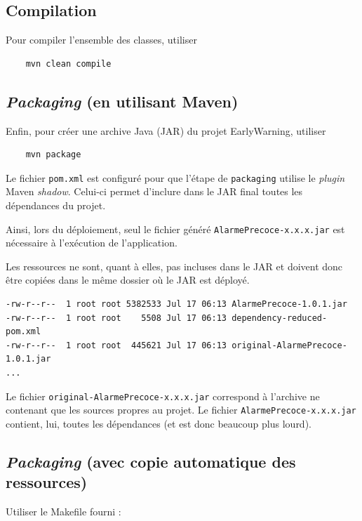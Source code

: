 \documentclass{article}
\begin{document}
\subsection{Compilation}

Pour compiler l'ensemble des classes, utiliser 

\begin{verbatim}
    mvn clean compile
\end{verbatim}

\subsection{\emph{Packaging} (en utilisant Maven)}

Enfin, pour créer une archive Java (JAR) du projet EarlyWarning, utiliser

\begin{verbatim}
    mvn package
\end{verbatim}

Le fichier \texttt{pom.xml} est configuré pour que l'étape de \texttt{packaging} utilise le \emph{plugin} Maven \emph{shadow}. Celui-ci permet d'inclure dans le JAR final toutes les dépendances du projet.

Ainsi, lors du déploiement, seul le fichier généré \texttt{AlarmePrecoce-x.x.x.jar} est nécessaire à l'exécution de l'application.

Les ressources ne sont, quant à elles, pas incluses dans le JAR et doivent donc être copiées dans le même dossier où le JAR est déployé.

\begin{verbatim}
-rw-r--r--  1 root root 5382533 Jul 17 06:13 AlarmePrecoce-1.0.1.jar
-rw-r--r--  1 root root    5508 Jul 17 06:13 dependency-reduced-pom.xml
-rw-r--r--  1 root root  445621 Jul 17 06:13 original-AlarmePrecoce-1.0.1.jar
...
\end{verbatim}

Le fichier \texttt{original-AlarmePrecoce-x.x.x.jar} correspond à l'archive ne contenant que les sources propres au projet. Le fichier \texttt{AlarmePrecoce-x.x.x.jar} contient, lui, toutes les dépendances (et est donc beaucoup plus lourd).

\subsection{\emph{Packaging} (avec copie automatique des ressources)}

Utiliser le Makefile fourni :
\end{document}
